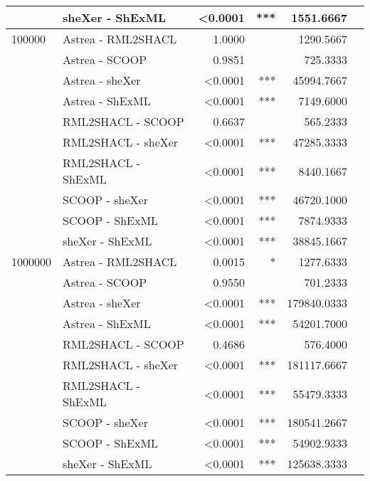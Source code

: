 \documentclass[10pt,a4paper]{article}
\begin{document}
\begin{table}[h]
\begin{tabular}{llrrrr}
      & sheXer - ShExML & \textless 0.0001 & *** & 1551.6667 \\
\hline
100000 & Astrea - RML2SHACL & 1.0000 & & 1290.5667  \\
       & Astrea - SCOOP & 0.9851 & & 725.3333 \\
       & Astrea - sheXer & \textless 0.0001 & *** & 45994.7667 \\
       & Astrea - ShExML & \textless 0.0001 & *** & 7149.6000 \\
       & RML2SHACL - SCOOP & 0.6637 & & 565.2333 & \\
       & RML2SHACL - sheXer & \textless 0.0001 & *** & 47285.3333 \\
       & RML2SHACL - ShExML & \textless 0.0001 & *** & 8440.1667 \\
       & SCOOP - sheXer & \textless 0.0001 & *** & 46720.1000 \\
       & SCOOP - ShExML & \textless 0.0001 & *** & 7874.9333 \\
       & sheXer - ShExML & \textless 0.0001 & *** & 38845.1667 \\
\hline
1000000 & Astrea - RML2SHACL & 0.0015 & * & 1277.6333 \\
        & Astrea - SCOOP & 0.9550 & & 701.2333 \\
        & Astrea - sheXer & \textless 0.0001 & *** & 179840.0333 \\
        & Astrea - ShExML & \textless 0.0001 & *** & 54201.7000 \\
        & RML2SHACL - SCOOP & 0.4686 & & 576.4000 \\
        & RML2SHACL - sheXer & \textless 0.0001 & *** & 181117.6667 \\
        & RML2SHACL - ShExML & \textless 0.0001 & *** & 55479.3333 \\
        & SCOOP - sheXer & \textless 0.0001 & *** & 180541.2667 \\
        & SCOOP - ShExML & \textless 0.0001 & *** & 54902.9333 \\
        & sheXer - ShExML & \textless 0.0001 & *** & 125638.3333 \\
\hline
\end{tabular}
\label{tab:postHocSHACL}
\end{table}
\end{document}
